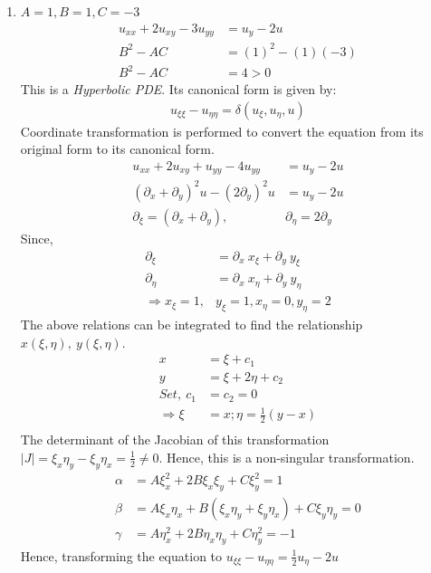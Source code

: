 \documentclass[11pt]{article}
\begin{document}
\begin{enumerate}
\begin{enumerate}[label=(\alph*)]
\item {\color{blue} $ A = 1, B = 1, C = -3$}
\begin{align*}
u_{xx} +2u_{xy} -3u_{yy} & = u_y - 2u \\
B^2 - AC & = (1)^2 - (1)(-3) \\
B^2 - AC & = 4 > 0 
\end{align*}
This is a \textit{Hyperbolic PDE}. Its canonical form is given by:
\begin{align*}
u_{\xi\xi} - u_{\eta\eta} = \delta(u_\xi, u_\eta, u)
\end{align*}
Coordinate transformation is performed to convert the equation from its original form to its canonical form. 
\begin{align*}
u_{xx} + 2u_{xy} + u_{yy} - 4u_{yy} & = u_y - 2u \\
\left(\partial_x + \partial_y \right)^2u - (2\partial_y)^2u & = u_y - 2u \\
\partial_\xi = \left(\partial_x + \partial_y \right), & \partial_\eta = 2\partial_y
\end{align*}
Since, 
\begin{align*}
\partial_\xi & = \partial_x \ x_\xi + \partial_y \ y_\xi \\
\partial_\eta & = \partial_x \ x_\eta + \partial_y \ y_\eta \\
\Rightarrow x_\xi = 1, & y_\xi = 1, x_\eta = 0, y_\eta = 2
\end{align*}
The above relations can be integrated to find the relationship $x(\xi,\eta), \ y(\xi,\eta)$. 
\begin{align*}
x & = \xi + c_1 \\
y & = \xi + 2\eta + c_2\\
Set, \ c_1 & = c_2 = 0 \\
\Rightarrow \xi & = x; \eta = \frac{1}{2}(y-x) \\
\end{align*}
The determinant of the Jacobian of this transformation $|J| = \xi_x\eta_y - \xi_y\eta_x = \frac{1}{2}\neq 0$. Hence, this is a non-singular transformation. 
\begin{align*}
\alpha & = A\xi^2_x + 2B\xi_x\xi_y + C\xi^2_y = 1 \\
\beta & = A\xi_x\eta_x + B\left(\xi_x\eta_y + \xi_y\eta_x \right) + C\xi_y\eta_y = 0 \\
\gamma & = A\eta^2_x + 2B\eta_x\eta_y + C\eta^2_y = -1
\end{align*}
Hence, transforming the equation to $u_{\xi\xi} - u_{\eta\eta} = \frac{1}{2}u_\eta - 2u$


\end{enumerate}
\end{enumerate}
\end{document}
